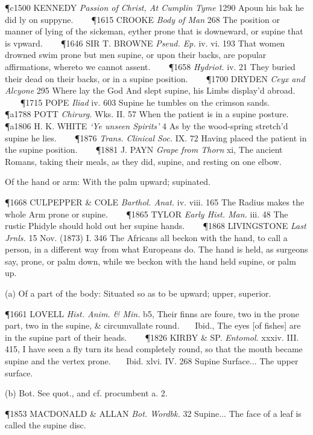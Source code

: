 \begin{description}[wide, labelwidth=!, labelindent=0pt]
\begin{myenumerate}
\P c1500 KENNEDY  \textit{Passion of Christ, At Cumplin Tyme} 1290 Apoun his bak he did ly on suppyne.    
\P 1615 CROOKE  \textit{Body of Man} 268 The position or manner of lying of the sickeman, eyther prone that is downeward, or supine that is vpward.    
\P 1646 SIR T. BROWNE  \textit{Pseud. Ep.} iv. vi. 193 That women drowned swim prone but men supine, or upon their backs, are popular affirmations, whereto we cannot assent.    
\P 1658   \textit{Hydriot.} iv. 21 They buried their dead on their backs, or in a supine position.    
\P 1700 DRYDEN  \textit{Ceyx and Alcyone} 295 Where lay the God And slept supine, his Limbs display'd abroad.    
\P 1715 POPE  \textit{Iliad} iv. 603 Supine he tumbles on the crimson sands.    
\P a1788 POTT  \textit{Chirurg.} Wks. II. 57 When the patient is in a supine posture.    
\P a1806 H. K. WHITE  \textit{‘Ye unseen Spirits’} 4 As by the wood-spring stretch'd supine he lies.    
\P 1876 \textit{Trans.  Clinical Soc.} IX. 72 Having placed the patient in the supine position.    
\P 1881 J. PAYN  \textit{Grape from Thorn} xi, The ancient Romans, taking their meals, as they did, supine, and resting on one elbow.

 Of the hand or arm: With the palm upward; supinated.

\P 1668 CULPEPPER \& COLE  \textit{Barthol. Anat.} iv. viii. 165 The Radius makes the whole Arm prone or supine.    
\P 1865 TYLOR  \textit{Early Hist. Man.} iii. 48 The rustic Phidyle should hold out her supine hands.    
\P 1868 LIVINGSTONE  \textit{Last Jrnls.} 15 Nov. (1873) I. 346 The Africans all beckon with the hand, to call a person, in a different way from what Europeans do. The hand is held, as surgeons say, prone, or palm down, while we beckon with the hand held supine, or palm up.

 (a) Of a part of the body: Situated so as to be upward; upper, superior.

\P 1661 LOVELL  \textit{Hist. Anim. \& Min.} b5, Their finns are foure, two in the prone part, two in the supine, \& circumvallate round.    Ibid., The eyes [of fishes] are in the supine part of their heads.    
\P 1826 KIRBY \& SP.  \textit{Entomol.} xxxiv. III. 415, I have seen a fly turn its head completely round, so that the mouth became supine and the vertex prone.    Ibid. xlvi. IV. 268 Supine Surface... The upper surface.

(b) Bot. See quot., and cf. procumbent a. 2.

\P 1853 MACDONALD \& ALLAN  \textit{Bot. Wordbk.} 32 Supine... The face of a leaf is called the supine disc.


\end{myenumerate}
\end{description}
